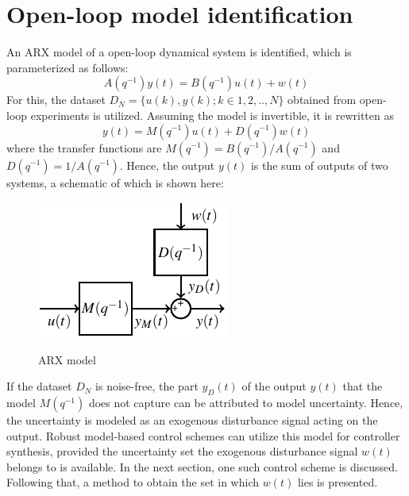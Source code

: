 \documentclass[letterpaper, 10 pt, conference]{ieeeconf}  %
\begin{document}
\section{Open-loop model identification}
An ARX model of a open-loop dynamical system is identified, which is parameterized as follows:
\begin{equation*} 
A(q^{-1})y(t)=B(q^{-1})u(t)+w(t)
\end{equation*}
For this, the dataset $D_N=\{u(k),y(k);k\in1,2,..,N\}$ obtained from open-loop experiments is utilized. Assuming the model is invertible, it is rewritten as
\begin{equation} 
y(t)=M(q^{-1})u(t)+D(q^{-1})w(t)
\label{tfmodel}
\end{equation}
where the transfer functions are $M(q^{-1})=B(q^{-1})/A(q^{-1})$ and $D(q^{-1})=1/A(q^{-1})$. Hence, the output $y(t)$ is the sum of outputs of two systems, a schematic of which is shown here:
	\begin{figure}[t]
		\vspace{-3pt}
		\hspace{45pt}
		\includegraphics[scale = 01.1]{final_robust.pdf}
		\label{fullloop}
		\caption{ARX model}
	\end{figure} 
If the dataset $D_N$ is noise-free, the part $y_D(t)$ of the output $y(t)$ that the model $M(q^{-1})$ does not capture can be attributed to model uncertainty. Hence, the uncertainty is modeled as an exogenous disturbance signal acting on the output. Robust model-based control schemes can utilize this model for controller synthesis, provided the uncertainty set the exogenous disturbance signal $w(t)$ belongs to is available. In the next section, one such control scheme is discussed. Following that, a method to obtain the set in which $w(t)$ lies is presented.
\end{document}
